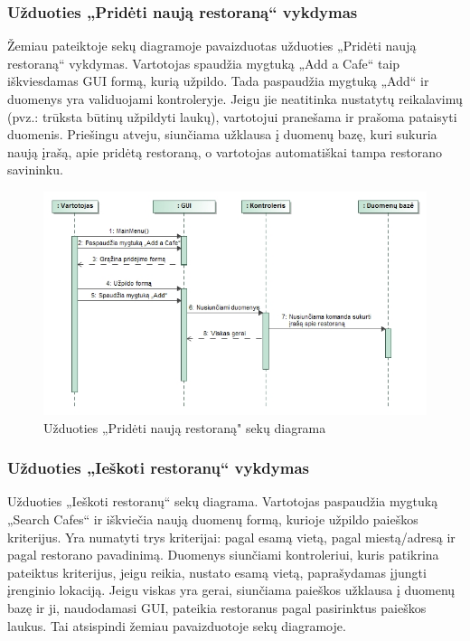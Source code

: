 \documentclass{VUMIFPSkursinis}
\begin{document}
\subsubsection{Užduoties „Pridėti naują restoraną“ vykdymas}
Žemiau pateiktoje sekų diagramoje pavaizduotas užduoties „Pridėti naują restoraną“ vykdymas. Vartotojas spaudžia mygtuką „Add a Cafe“ taip iškviesdamas GUI formą, kurią užpildo. Tada paspaudžia mygtuką „Add“ ir duomenys yra validuojami kontroleryje. Jeigu jie neatitinka nustatytų reikalavimų (pvz.: trūksta būtinų užpildyti laukų), vartotojui pranešama ir prašoma pataisyti duomenis. Priešingu atveju, siunčiama užklausa į duomenų bazę, kuri sukuria  naują įrašą, apie pridėtą restoraną, o vartotojas automatiškai tampa restorano savininku.

\begin{figure}[H]
	\centering
	\includegraphics[width=\textwidth,height=\textheight,keepaspectratio]{img/AddRestaurant}
	\caption{Užduoties „Pridėti naują restoraną" sekų diagrama}
	\label{img:AddRestaurant}
\end{figure}

\subsubsection{Užduoties „Ieškoti restoranų“ vykdymas}
Užduoties „Ieškoti restoranų“ sekų diagrama. Vartotojas paspaudžia mygtuką „Search Cafes“ ir iškviečia naują duomenų formą, kurioje užpildo paieškos kriterijus. Yra numatyti trys kriterijai: pagal esamą vietą, pagal miestą/adresą ir pagal restorano pavadinimą. Duomenys siunčiami kontroleriui, kuris patikrina pateiktus kriterijus, jeigu reikia, nustato esamą vietą, paprašydamas įjungti įrenginio lokaciją. Jeigu viskas yra gerai, siunčiama paieškos užklausa į duomenų bazę ir ji, naudodamasi GUI, pateikia restoranus pagal pasirinktus paieškos laukus. Tai atsispindi žemiau pavaizduotoje sekų diagramoje.
\end{document}
